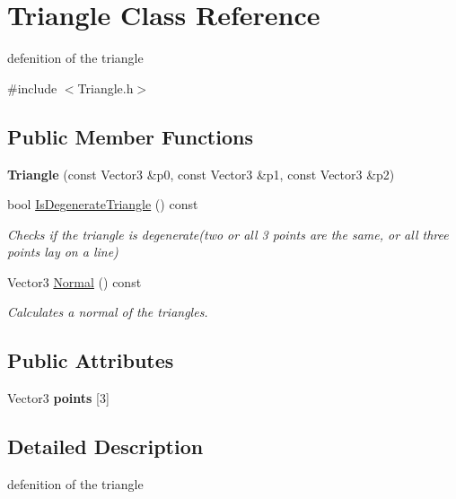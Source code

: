\hypertarget{classTriangle}{}\section{Triangle Class Reference}
\label{classTriangle}


defenition of the triangle  




{\ttfamily \#include $<$Triangle.\+h$>$}

\subsection*{Public Member Functions}
\begin{DoxyCompactItemize}
\item 
\mbox{\label{classTriangle_a92decf8cb6085cea9ff3db39637d8539}} 
{\bfseries Triangle} (const Vector3 \&p0, const Vector3 \&p1, const Vector3 \&p2)
\item 
bool \hyperlink{classTriangle_a475f07ea83d763614570c820dd10230b}{Is\+Degenerate\+Triangle} () const
\begin{DoxyCompactList}\small\item\em Checks if the triangle is degenerate(two or all 3 points are the same, or all three points lay on a line) \end{DoxyCompactList}\item 
Vector3 \hyperlink{classTriangle_afa65f5d26672ed568b4266a66a372c3a}{Normal} () const
\begin{DoxyCompactList}\small\item\em Calculates a normal of the triangles. \end{DoxyCompactList}\end{DoxyCompactItemize}
\subsection*{Public Attributes}
\begin{DoxyCompactItemize}
\item 
\mbox{\label{classTriangle_a7b7eb4c8f1bff4276ccc8a297e830767}} 
Vector3 {\bfseries points} \mbox{[}3\mbox{]}
\end{DoxyCompactItemize}


\subsection{Detailed Description}
defenition of the triangle 

